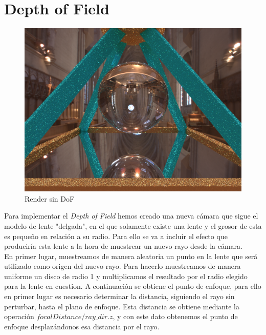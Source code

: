 \documentclass[10pt,oneside,a4paper]{article}
\begin{document}
\section{Depth of Field}

\begin{figure}[h]
\centering
\includegraphics[width=1\linewidth]{images/escena_2400x1800_128spp_dof0-0_screencap.png}
\caption{Render sin DoF}
\label{fig:disp}
\end{figure}

Para implementar el \textit{Depth of Field} hemos creado una nueva cámara que sigue el modelo de lente "delgada", en el que solamente existe una lente y el grosor de esta es pequeño en relación a su radio. Para ello se va a incluir el efecto que produciría esta lente a la hora de muestrear un nuevo rayo desde la cámara.\\

En primer lugar, muestreamos de manera aleatoria un punto en la lente que será utilizado como origen del nuevo rayo. Para hacerlo muestreamos de manera uniforme un disco de radio 1 y multiplicamos el resultado por el radio elegido para la lente en cuestion. A continuación se obtiene el punto de enfoque, para ello en primer lugar es necesario determinar la distancia, siguiendo el rayo sin perturbar, hasta el plano de enfoque. Esta distancia se obtiene mediante la operación $focalDistance/ ray\_dir.z$, y con este dato obtenemos el punto de enfoque desplazándonos esa distancia por el rayo.\\
\end{document}
